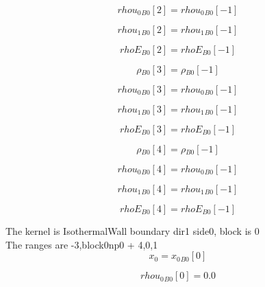\documentclass{article}
\begin{document}
\begin{dmath}{rhou_{0}{_{B0}}}[{2}] = {rhou_{0}{_{B0}}}[{-1}]\end{dmath}

\begin{dmath}{rhou_{1}{_{B0}}}[{2}] = {rhou_{1}{_{B0}}}[{-1}]\end{dmath}

\begin{dmath}{rhoE{_{B0}}}[{2}] = {rhoE{_{B0}}}[{-1}]\end{dmath}

\begin{dmath}{\rho{_{B0}}}[{3}] = {\rho{_{B0}}}[{-1}]\end{dmath}

\begin{dmath}{rhou_{0}{_{B0}}}[{3}] = {rhou_{0}{_{B0}}}[{-1}]\end{dmath}

\begin{dmath}{rhou_{1}{_{B0}}}[{3}] = {rhou_{1}{_{B0}}}[{-1}]\end{dmath}

\begin{dmath}{rhoE{_{B0}}}[{3}] = {rhoE{_{B0}}}[{-1}]\end{dmath}

\begin{dmath}{\rho{_{B0}}}[{4}] = {\rho{_{B0}}}[{-1}]\end{dmath}

\begin{dmath}{rhou_{0}{_{B0}}}[{4}] = {rhou_{0}{_{B0}}}[{-1}]\end{dmath}

\begin{dmath}{rhou_{1}{_{B0}}}[{4}] = {rhou_{1}{_{B0}}}[{-1}]\end{dmath}

\begin{dmath}{rhoE{_{B0}}}[{4}] = {rhoE{_{B0}}}[{-1}]\end{dmath}

\noindent The kernel is IsothermalWall boundary dir1 side0, block is 0\\\noindent The ranges are -3,block0np0 + 4,0,1\\\begin{dmath}x_{0} = {x_{0}{_{B0}}}[{0}]\end{dmath}

\begin{dmath}{rhou_{0}{_{B0}}}[{0}] = 0.0\end{dmath}
\end{document}
